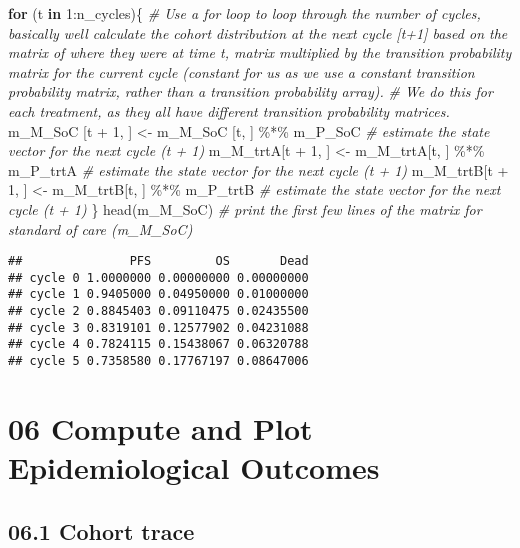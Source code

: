 \documentclass[
]{article}
\newenvironment{Shaded}{\begin{snugshade}}{\end{snugshade}}
\newcommand{\CommentTok}[1]{\textcolor[rgb]{0.56,0.35,0.01}{\textit{#1}}}
\newcommand{\ControlFlowTok}[1]{\textcolor[rgb]{0.13,0.29,0.53}{\textbf{#1}}}
\newcommand{\DecValTok}[1]{\textcolor[rgb]{0.00,0.00,0.81}{#1}}
\newcommand{\FunctionTok}[1]{\textcolor[rgb]{0.00,0.00,0.00}{#1}}
\newcommand{\NormalTok}[1]{#1}
\newcommand{\OtherTok}[1]{\textcolor[rgb]{0.56,0.35,0.01}{#1}}
\newcommand{\SpecialCharTok}[1]{\textcolor[rgb]{0.00,0.00,0.00}{#1}}
\begin{document}
\begin{Shaded}
\begin{Highlighting}[]
\ControlFlowTok{for}\NormalTok{ (t }\ControlFlowTok{in} \DecValTok{1}\SpecialCharTok{:}\NormalTok{n\_cycles)\{  }\CommentTok{\# Use a for loop to loop through the number of cycles, basically we\textquotesingle{}ll calculate the cohort distribution at the next cycle [t+1] based on the matrix of where they were at time t, matrix multiplied by the transition probability matrix for the current cycle (constant for us as we use a constant transition probability matrix, rather than a transition probability array).}
\CommentTok{\# We do this for each treatment, as they all have different transition probability matrices. }
\NormalTok{  m\_M\_SoC [t }\SpecialCharTok{+} \DecValTok{1}\NormalTok{, ] }\OtherTok{\textless{}{-}}\NormalTok{ m\_M\_SoC [t, ] }\SpecialCharTok{\%*\%}\NormalTok{ m\_P\_SoC   }\CommentTok{\# estimate the state vector for the next cycle (t + 1)}
\NormalTok{  m\_M\_trtA[t }\SpecialCharTok{+} \DecValTok{1}\NormalTok{, ] }\OtherTok{\textless{}{-}}\NormalTok{ m\_M\_trtA[t, ] }\SpecialCharTok{\%*\%}\NormalTok{ m\_P\_trtA  }\CommentTok{\# estimate the state vector for the next cycle (t + 1)}
\NormalTok{  m\_M\_trtB[t }\SpecialCharTok{+} \DecValTok{1}\NormalTok{, ] }\OtherTok{\textless{}{-}}\NormalTok{ m\_M\_trtB[t, ] }\SpecialCharTok{\%*\%}\NormalTok{ m\_P\_trtB  }\CommentTok{\# estimate the state vector for the next cycle (t + 1)}
\NormalTok{\}}
\FunctionTok{head}\NormalTok{(m\_M\_SoC)  }\CommentTok{\# print the first few lines of the matrix for standard of care (m\_M\_SoC)}
\end{Highlighting}
\end{Shaded}

\begin{verbatim}
##               PFS         OS       Dead
## cycle 0 1.0000000 0.00000000 0.00000000
## cycle 1 0.9405000 0.04950000 0.01000000
## cycle 2 0.8845403 0.09110475 0.02435500
## cycle 3 0.8319101 0.12577902 0.04231088
## cycle 4 0.7824115 0.15438067 0.06320788
## cycle 5 0.7358580 0.17767197 0.08647006
\end{verbatim}

\hypertarget{compute-and-plot-epidemiological-outcomes}{%
\section{06 Compute and Plot Epidemiological
Outcomes}\label{compute-and-plot-epidemiological-outcomes}}

\hypertarget{cohort-trace-1}{%
\subsection{06.1 Cohort trace}\label{cohort-trace-1}}
\end{document}
